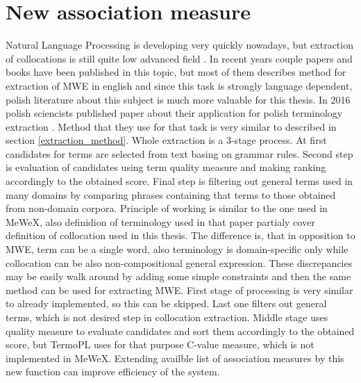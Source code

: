 \chapter{New association measure}

Natural Language Processing is developing very quickly nowadays, but extraction of collocations is still quite low advanced field \cite{ramisch}. 
In recent years couple papers and books have been published in this topic, but most of them describes method for extraction of MWE in english 
and since this task is strongly language dependent, polish literature about this subject is much more valuable for this thesis.
In 2016 polish sciencists published paper about their application for polish terminology extraction \cite{termopl}. 
Method that they use for that task is very similar to described in section \ref{extraction_method}. 
Whole extraction is a 3-stage process. At first candidates for terms are selected from text basing on grammar rules. 
Second step is evaluation of candidates using term quality measure and making ranking accordingly to the obtained score. 
Final step is filtering out general terms used in many domains by comparing phrases containing that terms to those obtained from non-domain corpora.
Principle of working is similar to the one used in MeWeX, also definidion of terminology used in that paper 
partialy cover definition of collocation used in this thesis. The difference is, that in opposition to MWE, term can be a single word, 
also terminology is domain-specific only while collocation can be also non-compositional general expression. 
These discrepancies may be easily walk around by adding some simple constraints and then the same method can be used for extracting MWE. 
First stage of processing is very similar to already implemented, so this can be skipped. Last one filters out general terms, 
which is not desired step in collocation extraction. Middle stage uses quality measure to evaluate candidates and sort them 
accordingly to the obtained score, but TermoPL uses for that purpose C-value measure, which is not implemented in MeWeX. 
Extending availble list of association measures by this new function can improve efficiency of the system.

